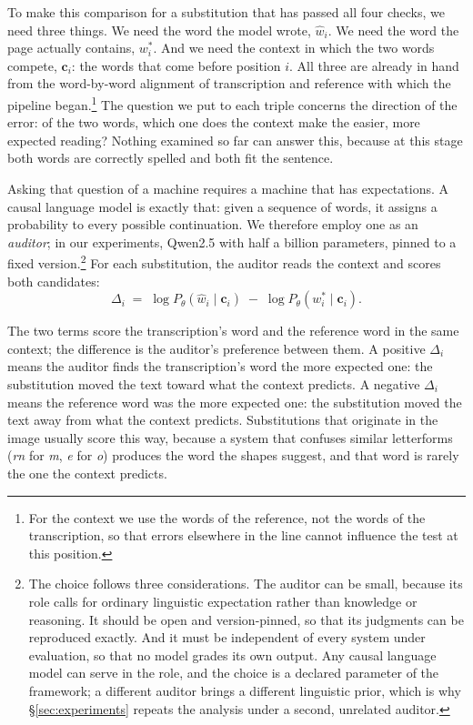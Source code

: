 \documentclass{anthology-ch}         %
\begin{document}
To make this comparison for a substitution that has passed all four checks, we need three things. We need the word the model wrote, $\hat{w}_i$. We need the word the page actually contains, $w^{*}_i$. And we need the context in which the two words compete, $\mathbf{c}_i$: the words that come before position $i$. All three are already in hand from the word-by-word alignment of transcription and reference with which the pipeline began.\footnote{For the context we use the words of the reference, not the words of the transcription, so that errors elsewhere in the line cannot influence the test at this position.} The question we put to each triple concerns the direction of the error: of the two words, which one does the context make the easier, more expected reading? Nothing examined so far can answer this, because at this stage both words are correctly spelled and both fit the sentence.

Asking that question of a machine requires a machine that has expectations. A causal language model is exactly that: given a sequence of words, it assigns a probability to every possible continuation. We therefore employ one as an \emph{auditor}; in our experiments, Qwen2.5 with half a billion parameters, pinned to a fixed version.\footnote{The choice follows three considerations. The auditor can be small, because its role calls for ordinary linguistic expectation rather than knowledge or reasoning. It should be open and version-pinned, so that its judgments can be reproduced exactly. And it must be independent of every system under evaluation, so that no model grades its own output. Any causal language model can serve in the role, and the choice is a declared parameter of the framework; a different auditor brings a different linguistic prior, which is why \S\ref{sec:experiments} repeats the analysis under a second, unrelated auditor.} For each substitution, the auditor reads the context and scores both candidates:
%
\begin{equation}
    \Delta_i \;=\; \log P_{\theta}\!\left(\hat{w}_i \mid \mathbf{c}_i\right)
             \;-\; \log P_{\theta}\!\left(w^{*}_i \mid \mathbf{c}_i\right).
    \label{eq:delta}
\end{equation}
%

The two terms score the transcription's word and the reference word in the same context; the difference is the auditor's preference between them. A positive $\Delta_i$ means the auditor finds the transcription's word the more expected one: the substitution moved the text toward what the context predicts. A negative $\Delta_i$ means the reference word was the more expected one: the substitution moved the text away from what the context predicts. Substitutions that originate in the image usually score this way, because a system that confuses similar letterforms (\emph{rn} for \emph{m}, \emph{e} for \emph{o}) produces the word the shapes suggest, and that word is rarely the one the context predicts.
\end{document}
